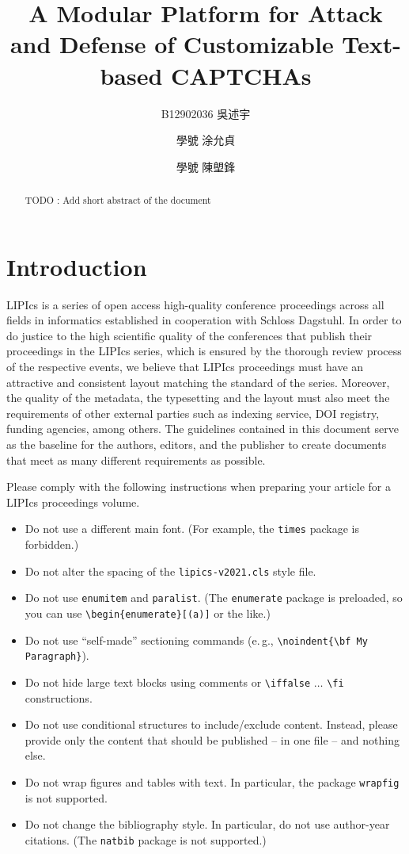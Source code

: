 \documentclass[a4paper,UKenglish,cleveref, autoref, thm-restate]{lipics-v2021}
\title{A Modular Platform for Attack and Defense of Customizable Text-based CAPTCHAs}
\author{B12902036 吳述宇 \and {學號} 涂允貞 \and {學號} 陳塱鋒}{CNS Final Project Group 3, Spring 2025}{}{}{}
\begin{document}
\maketitle

\begin{abstract}
TODO : Add short abstract of the document
\end{abstract}

\section{Introduction}
\label{sec:typesetting-summary}

LIPIcs is a series of open access high-quality conference proceedings across all fields in informatics established in cooperation with Schloss Dagstuhl. 
In order to do justice to the high scientific quality of the conferences that publish their proceedings in the LIPIcs series, which is ensured by the thorough review process of the respective events, we believe that LIPIcs proceedings must have an attractive and consistent layout matching the standard of the series.
Moreover, the quality of the metadata, the typesetting and the layout must also meet the requirements of other external parties such as indexing service, DOI registry, funding agencies, among others. The guidelines contained in this document serve as the baseline for the authors, editors, and the publisher to create documents that meet as many different requirements as possible. 

Please comply with the following instructions when preparing your article for a LIPIcs proceedings volume. 

\begin{itemize}
\item Do not use a different main font. (For example, the \texttt{times} package is forbidden.)
\item Do not alter the spacing of the \texttt{lipics-v2021.cls} style file.
\item Do not use \verb+enumitem+ and \verb+paralist+. (The \texttt{enumerate} package is preloaded, so you can use
 \verb+\begin{enumerate}[(a)]+ or the like.)
\item Do not use ``self-made'' sectioning commands (e.\,g., \verb+\noindent{\bf My+ \verb+Paragraph}+).
\item Do not hide large text blocks using comments or \verb+\iffalse+ $\ldots$ \verb+\fi+ constructions. 
\item Do not use conditional structures to include/exclude content. Instead, please provide only the content that should be published -- in one file -- and nothing else.
\item Do not wrap figures and tables with text. In particular, the package \texttt{wrapfig} is not supported.
\item Do not change the bibliography style. In particular, do not use author-year citations. (The
\texttt{natbib} package is not supported.)
\end{itemize}
\end{document}
